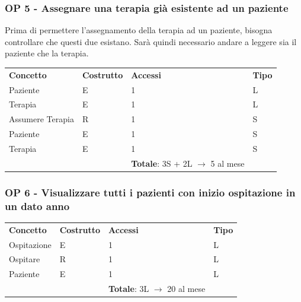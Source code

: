 \documentclass[a4paper, 12pt]{report}
\begin{document}
\subsubsection*{OP 5 - Assegnare una terapia già esistente ad un paziente}
Prima di permettere l'assegnamento della terapia ad un paziente, bisogna controllare che questi due esistano.
Sarà quindi necessario andare a leggere sia il paziente che la terapia. \par
\bigskip
\noindent
\begin{tabularx}{\textwidth}{XlXl}
        \rowcolor{seaGreen}
        \textbf{Concetto} & \textbf{Costrutto} & \textbf{Accessi} & \textbf{Tipo} \\
        Paziente & E & 1 & L \\
        \hline
        Terapia & E & 1 & L \\
        \hline
        Assumere Terapia & R & 1 & S \\
        \hline
        Paziente & E & 1 & S \\
        \hline
        Terapia & E & 1 & S \\
        \rowcolor{seaGreen}
         &  & \textbf{Totale}: 3S + 2L $\rightarrow$ 5 al mese & \\
\end{tabularx}

\subsubsection*{OP 6 - Visualizzare tutti i pazienti con inizio ospitazione in un dato anno}
\begin{tabularx}{\textwidth}{XlXl}
        \rowcolor{seaGreen}
        \textbf{Concetto} & \textbf{Costrutto} & \textbf{Accessi} & \textbf{Tipo} \\
        Ospitazione & E & 1 & L \\
        \hline
        Ospitare & R & 1 & L \\
        \hline
        Paziente & E & 1 & L \\
        \rowcolor{seaGreen}
         &  & \textbf{Totale}: 3L $\rightarrow$ 20 al mese & \\
\end{tabularx}
\end{document}
